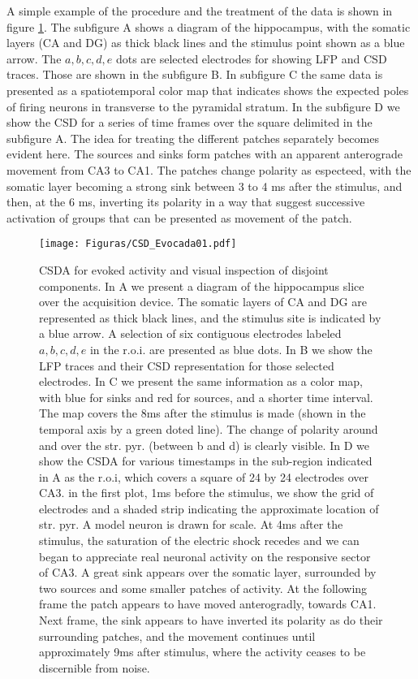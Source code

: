 \documentclass{article}
\begin{document}
A simple example of the procedure and the treatment of the data is shown in figure
\ref{CSD_Evocada01}.  The subfigure A  shows a diagram of the hippocampus, with
the somatic layers (CA and DG) as thick black lines and the stimulus point
shown as a blue arrow. The $a,b,c,d,e$ dots are selected electrodes for
showing LFP and CSD traces. Those are shown in the subfigure B. In subfigure
C the same data is presented as a spatiotemporal color map that
indicates shows the expected poles of firing neurons in transverse to the
pyramidal stratum.  In the subfigure D we show the CSD for a series of time frames
over the square delimited in the subfigure A. The idea for treating the different
patches separately becomes evident here. The sources and sinks form patches
with an apparent anterograde movement from CA3 to CA1. The patches change polarity
as especteed, with the somatic layer becoming a strong sink between 3 to 4 ms
after the stimulus, and then, at the 6 ms, inverting its polarity in a way that suggest
successive activation of groups that can be presented as movement of the patch.

\begin{figure}[h]
  \texttt{[image: Figuras/CSD\_Evocada01.pdf]}
  \caption{ CSDA for evoked activity and visual inspection of disjoint
    components. In A we present a diagram of the hippocampus slice over
    the acquisition device. The somatic layers of CA and DG are represented as
    thick black lines, and the stimulus site is indicated by a blue arrow. A selection
    of six contiguous electrodes labeled $a,b,c,d,e$ in the r.o.i. are presented as blue
    dots. In B we show the LFP traces and their CSD representation for those
    selected electrodes. In C we present the same information as a color map,
    with blue for sinks and red for sources, and a shorter time interval. The
    map covers the 8ms after the stimulus is made (shown in the temporal axis by a
    green doted line). The change of polarity around and over the str. pyr. (between b and
    d) is clearly visible. In D we show the CSDA for various timestamps in the sub-region
    indicated in A as the r.o.i, which covers a square of 24 by 24 electrodes over CA3.
    in the first plot, 1ms before the stimulus, we show the grid of electrodes and a
    shaded strip indicating the approximate location of str. pyr. A model neuron is
    drawn for scale. At 4ms after the stimulus, the saturation of the electric shock
    recedes and we can began to appreciate real neuronal activity on the responsive
    sector of CA3. A great sink appears over the somatic layer, surrounded by two
    sources and some smaller patches of activity. At the following frame the patch
    appears to have moved anterogradly, towards CA1. Next frame, the sink appears
    to have inverted its polarity as do their surrounding patches, and the movement
    continues until approximately 9ms after stimulus, where the activity ceases to be
    discernible from noise.}
  \label{CSD_Evocada01}
\end{figure}
\end{document}
